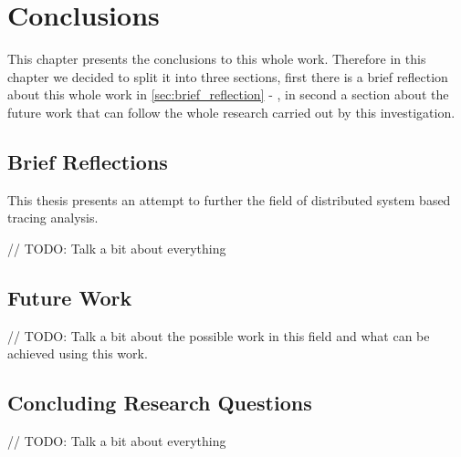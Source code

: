 \glsresetall
\chapter{Conclusions}
\label{chap:conclusions}

This chapter presents the conclusions to this whole work. Therefore in this chapter we decided to split it into three sections, first there is a brief reflection about this whole work in \ref{sec:brief_reflection} - , in second a section about the future work that can follow the whole research carried out by this investigation.

\section{Brief Reflections}
\label{sec:brief_reflections}

This thesis presents an attempt to further the field of distributed system based tracing analysis.

// TODO: Talk a bit about everything


\section{Future Work}
\label{sec:future_work}

// TODO: Talk a bit about the possible work in this field and what can be achieved using this work.


\section{Concluding Research Questions}
\label{sec:concluding_research_questions}

// TODO: Talk a bit about everything


\checkoddpage
{}
{ %
\newpage
\blankpage}
{ %
}
